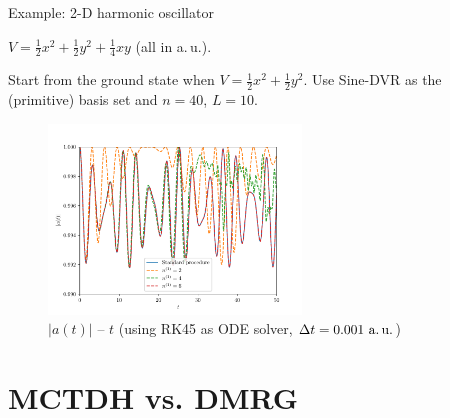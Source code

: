 \documentclass[12pt]{beamer}
\begin{document}
    \begin{frame}{Example: 2-D harmonic oscillator}
        \footnotesize{
            $V = \frac{1}{2}x^2 + \frac{1}{2}y^2 + \frac{1}{4}xy$ (all in a.\,u.).
        
            Start from the ground state when $V = \frac{1}{2}x^2 + \frac{1}{2}y^2$. Use Sine-DVR as the (primitive) basis set and $n=40$, $L=10$.
        }
        \begin{figure}
            \includegraphics[width=0.6\textwidth]{autocorr_MCTDH.pdf}
            \caption{$|a(t)|$ -- $t$ (using RK45 as ODE solver, $\Delta t = 0.001~\text{a.\,u.}$)}
        \end{figure}
    \end{frame}

    \section{MCTDH vs. DMRG}
\end{document}
